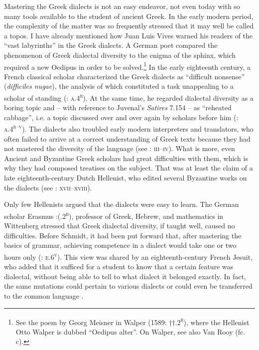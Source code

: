 Mastering the Greek dialects is not an easy endeavor, not even today with so many tools available to the student of ancient Greek. In the early modern period, the complexity of the matter was so frequently stressed that it may well be called a topos. I have already mentioned how Juan Luis Vives warned his readers of the “vast labyrinths” in the Greek dialects. A German poet compared the phenomenon of Greek dialectal diversity to the enigma of the sphinx, which required a new Oedipus in order to be solved.\footnote{See the poem by Georg Meisner in Walper (1589: ††.2\textsc{\textsuperscript{r}}), where the Hellenist Otto Walper is dubbed “Oedipus alter”. On Walper, see also Van Rooy (fc. c).} In the early eighteenth century, a French classical scholar characterized the Greek dialects as “difficult nonsense” (\textit{difficiles nugae}), the analysis of which constituted a task unappealing to a scholar of standing (\citealt{Maittaire1706}: \textsc{a.4}\textsc{\textsuperscript{r}}). At the same time, he regarded dialectal diversity as a boring topic and – with reference to Juvenal’s \textit{Satires} 7.154 – as “reheated cabbage”, i.e. a topic discussed over and over again by scholars before him (\citealt{Maittaire1706}: \textsc{a.4}\textsc{\textsuperscript{r–v}}). The dialects also troubled early modern interpreters and translators, who often failed to arrive at a correct understanding of Greek texts because they had not mastered the diversity of the language (see \citealt{Facius1782}: \textsc{iii–iv}). What is more, even Ancient and Byzantine Greek scholars had great difficulties with them, which is why they had composed treatises on the subject. That was at least the claim of a late eighteenth-century Dutch Hellenist, who edited several Byzantine works on the dialects (see \citealt{Koen1766}: \textsc{xvii–xviii}).

Only few Hellenists argued that the dialects were easy to learn. The German scholar Erasmus \citet[]{Schmidt1604}:(.2\textsc{\textsuperscript{r}}), professor of Greek, Hebrew, and mathematics in Wittenberg stressed that Greek dialectal diversity, if taught well, caused no difficulties. Before Schmidt, it had been put forward that, after mastering the basics of grammar, achieving competence in a dialect would take one or two hours only (\citealt{Caselius1560}: \textsc{e.6}\textsc{\textsuperscript{v}}). This view was shared by an eighteenth-century French Jesuit, who added that it sufficed for a student to know that a certain feature was dialectal, without being able to tell to what dialect it belonged exactly. In fact, the same mutations could pertain to various dialects or could even be transferred to the common language \citep[101]{Giraudeau1739}.

